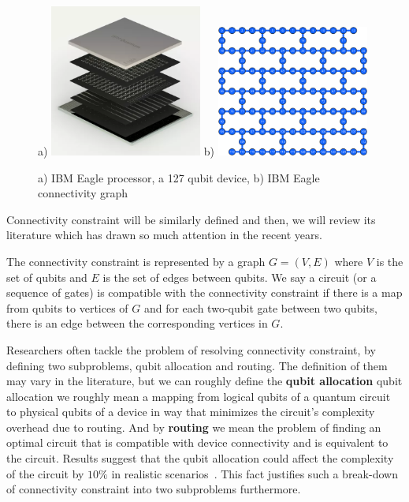 \begin{figure}[h!]
  \centering
  a) \includegraphics*[width=5cm]{shapes/ibm_dev}
  b) \includegraphics*[width=5cm]{shapes/ibm_conn}
  \caption{a) IBM Eagle processor, a 127 qubit device, b) IBM Eagle connectivity graph \cite{ibm2021}}
  \label{fig:connectivity}
\end{figure}

Connectivity constraint will be similarly defined and then, we will review its literature which has drawn so much attention in the recent years.

\begin{definition}
  The connectivity constraint is represented by a graph $G = (V, E)$ where $V$ is the set of qubits and $E$ is the set of edges between qubits. We say a circuit (or a sequence of gates) is compatible with the connectivity constraint if there is a map from qubits to vertices of $G$ and for each two-qubit gate between two qubits, there is an edge between the corresponding vertices in $G$.
\end{definition}

Researchers often tackle the problem of resolving connectivity constraint, by defining two subproblems, qubit allocation and routing. The definition of them may vary in the literature, but we can roughly define the \textbf{qubit allocation} qubit allocation we roughly mean a mapping from logical qubits of a quantum circuit to physical qubits of a device in way that minimizes the circuit's complexity overhead due to routing. And by \textbf{routing} we mean the problem of finding an optimal circuit that is compatible with device connectivity and is equivalent to the circuit. Results suggest that the qubit allocation could affect the complexity of the circuit by $10\%$ in realistic scenarios~\cite{paler2019}. This fact justifies such a break-down of connectivity constraint into two subproblems furthermore.

